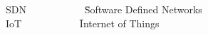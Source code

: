 \glossary
    \begin{tabbing}
    SDN ~~~~~~~~~~~\= Software Defined Networks\\
    IoT ~~~~~~~~~~~\= Internet of Things\\
    \end{tabbing}
\endglossary
